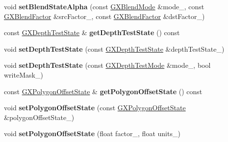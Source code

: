 \begin{DoxyCompactItemize}
\item 
void {\bfseries set\+Blend\+State\+Alpha} (const \hyperlink{class_i_dream_sky_1_1_g_x_blend_mode}{G\+X\+Blend\+Mode} \&mode\+\_\+, const \hyperlink{class_i_dream_sky_1_1_g_x_blend_factor}{G\+X\+Blend\+Factor} \&src\+Factor\+\_\+, const \hyperlink{class_i_dream_sky_1_1_g_x_blend_factor}{G\+X\+Blend\+Factor} \&dst\+Factor\+\_\+)\hypertarget{class_i_dream_sky_1_1_g_x_context_ad9fd13f072e3fbd149622ce31012619f}{}\label{class_i_dream_sky_1_1_g_x_context_ad9fd13f072e3fbd149622ce31012619f}

\item 
const \hyperlink{class_i_dream_sky_1_1_g_x_depth_test_state}{G\+X\+Depth\+Test\+State} \& {\bfseries get\+Depth\+Test\+State} () const \hypertarget{class_i_dream_sky_1_1_g_x_context_af9249ab05633c731ade3e57849cd5cac}{}\label{class_i_dream_sky_1_1_g_x_context_af9249ab05633c731ade3e57849cd5cac}

\item 
void {\bfseries set\+Depth\+Test\+State} (const \hyperlink{class_i_dream_sky_1_1_g_x_depth_test_state}{G\+X\+Depth\+Test\+State} \&depth\+Test\+State\+\_\+)\hypertarget{class_i_dream_sky_1_1_g_x_context_a92fc4f92b0074224b3316690da2ff1c9}{}\label{class_i_dream_sky_1_1_g_x_context_a92fc4f92b0074224b3316690da2ff1c9}

\item 
void {\bfseries set\+Depth\+Test\+State} (const \hyperlink{class_i_dream_sky_1_1_g_x_depth_test_mode}{G\+X\+Depth\+Test\+Mode} \&mode\+\_\+, bool write\+Mask\+\_\+)\hypertarget{class_i_dream_sky_1_1_g_x_context_a850fc290dd4a385ab0b38208da2c3926}{}\label{class_i_dream_sky_1_1_g_x_context_a850fc290dd4a385ab0b38208da2c3926}

\item 
const \hyperlink{class_i_dream_sky_1_1_g_x_polygon_offset_state}{G\+X\+Polygon\+Offset\+State} \& {\bfseries get\+Polygon\+Offset\+State} () const \hypertarget{class_i_dream_sky_1_1_g_x_context_a19206dd8521338e47c185f81598e298a}{}\label{class_i_dream_sky_1_1_g_x_context_a19206dd8521338e47c185f81598e298a}

\item 
void {\bfseries set\+Polygon\+Offset\+State} (const \hyperlink{class_i_dream_sky_1_1_g_x_polygon_offset_state}{G\+X\+Polygon\+Offset\+State} \&polygon\+Offset\+State\+\_\+)\hypertarget{class_i_dream_sky_1_1_g_x_context_a75d204c3899565fadd9cad49a983e89c}{}\label{class_i_dream_sky_1_1_g_x_context_a75d204c3899565fadd9cad49a983e89c}

\item 
void {\bfseries set\+Polygon\+Offset\+State} (float factor\+\_\+, float units\+\_\+)\hypertarget{class_i_dream_sky_1_1_g_x_context_aff2bbb79caf79f5dfffddce4673276d0}{}\label{class_i_dream_sky_1_1_g_x_context_aff2bbb79caf79f5dfffddce4673276d0}


\end{DoxyCompactItemize}
